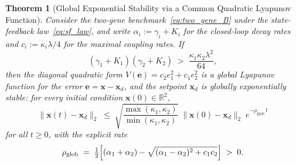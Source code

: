 \documentclass[12pt]{article}
\newtheorem{theorem}{Theorem}
\begin{document}
\begin{theorem}[Global Exponential Stability via a Common Quadratic Lyapunov Function]
\label{thm:global_sf}
Consider the two-gene benchmark~\eqref{eq:two_gene_B} under the
state-feedback law~\eqref{eq:sf_law}, and write
$\alpha_i:=\gamma_i+K_i$ for the closed-loop decay rates and
$c_i:=\kappa_i\lambda/4$ for the maximal coupling rates. If
\begin{equation}
(\gamma_1+K_1)(\gamma_2+K_2) \;>\; \frac{\kappa_1\kappa_2\lambda^2}{64},
\label{eq:global_cond}
\end{equation}
then the diagonal quadratic form $V(\mathbf{e})=c_2 e_1^2+c_1 e_2^2$ is a
global Lyapunov function for the error $\mathbf{e}=\mathbf{x}-\mathbf{x}_d$,
and the setpoint $\mathbf{x}_d$ is \emph{globally exponentially stable}:
for every initial condition $\mathbf{x}(0)\in\mathbb{R}^2$,
\begin{equation}
\|\mathbf{x}(t)-\mathbf{x}_d\|_2 \;\le\;
   \sqrt{\frac{\max(\kappa_1,\kappa_2)}{\min(\kappa_1,\kappa_2)}}\;
   \|\mathbf{x}(0)-\mathbf{x}_d\|_2\;e^{-\rho_{\mathrm{glob}}\,t}
\label{eq:global_decay}
\end{equation}
for all $t\ge 0$, with the explicit rate
\begin{equation}
\rho_{\mathrm{glob}} \;=\;
\tfrac{1}{2}\Bigl[(\alpha_1+\alpha_2)
   -\sqrt{(\alpha_1-\alpha_2)^2+c_1c_2}\Bigr] \;>\;0.
\label{eq:rho_glob}
\end{equation}
\end{theorem}
\end{document}
